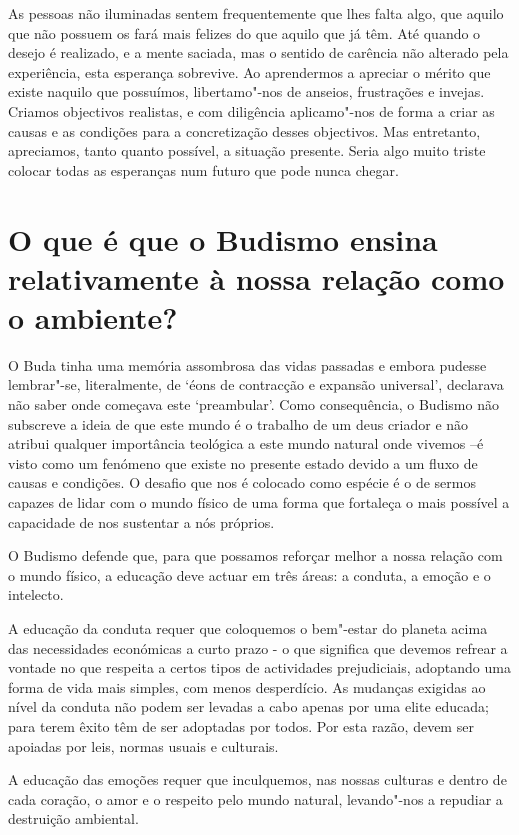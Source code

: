As pessoas não iluminadas sentem frequentemente que lhes falta algo, que
aquilo que não possuem os fará mais felizes do que aquilo que já têm.
Até quando o desejo é realizado, e a mente saciada, mas o sentido de
carência não alterado pela experiência, esta esperança sobrevive. Ao
aprendermos a apreciar o mérito que existe naquilo que possuímos,
libertamo"-nos de anseios, frustrações e invejas. Criamos objectivos
realistas, e com diligência aplicamo"-nos de forma a criar as causas e as
condições para a concretização desses objectivos. Mas entretanto,
apreciamos, tanto quanto possível, a situação presente. Seria algo muito
triste colocar todas as esperanças num futuro que pode nunca chegar.

\section{O que é que o Budismo ensina relativamente à nossa relação como o
  ambiente?}

\enlargethispage{\baselineskip}

O Buda tinha uma memória assombrosa das vidas passadas e embora pudesse
lembrar"-se, literalmente, de `éons de contracção e expansão
universal', declarava não saber onde começava este `preambular'. Como
consequência, o Budismo não subscreve a ideia de que este mundo é o
trabalho de um deus criador e não atribui qualquer importância teológica
a este mundo natural onde vivemos --é visto como um fenómeno que existe
no presente estado devido a um fluxo de causas e condições. O desafio
que nos é colocado como espécie é o de sermos capazes de lidar com o
mundo físico de uma forma que fortaleça o mais possível a capacidade de
nos sustentar a nós próprios.

O Budismo defende que, para que possamos reforçar melhor a nossa relação
com o mundo físico, a educação deve actuar em três áreas: a conduta, a
emoção e o intelecto.

A educação da conduta requer que coloquemos o bem"-estar do planeta acima
das necessidades económicas a curto prazo - o que significa que devemos
refrear a vontade no que respeita a certos tipos de actividades
prejudiciais, adoptando uma forma de vida mais simples, com menos
desperdício. As mudanças exigidas ao nível da conduta não podem ser
levadas a cabo apenas por uma elite educada; para terem êxito têm de ser
adoptadas por todos. Por esta razão, devem ser apoiadas por leis, normas
usuais e culturais.

A educação das emoções requer que inculquemos, nas nossas culturas e
dentro de cada coração, o amor e o respeito pelo mundo natural,
levando"-nos a repudiar a destruição ambiental.

